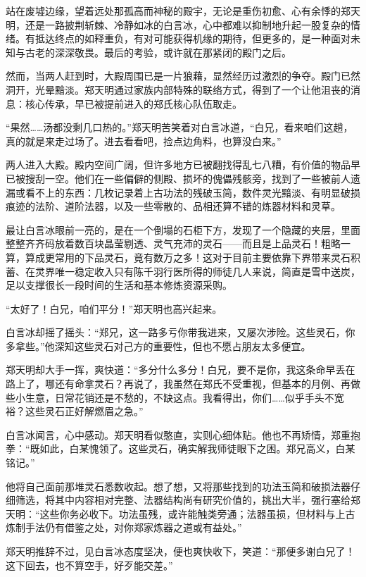 站在废墟边缘，望着远处那孤高而神秘的殿宇，无论是重伤初愈、心有余悸的郑天明，还是一路披荆斩棘、冷静如冰的白言冰，心中都难以抑制地升起一股复杂的情绪。有抵达终点的如释重负，有对可能获得机缘的期待，但更多的，是一种面对未知与古老的深深敬畏。最后的考验，或许就在那紧闭的殿门之后。

然而，当两人赶到时，大殿周围已是一片狼藉，显然经历过激烈的争夺。殿门已然洞开，光晕黯淡。郑天明通过家族内部特殊的联络方式，得到了一个让他沮丧的消息：核心传承，早已被提前进入的郑氏核心队伍取走。

“果然……汤都没剩几口热的。”郑天明苦笑着对白言冰道，“白兄，看来咱们这趟，真的就是来走过场了。进去看看吧，捡点边角料，也算没白来。”

两人进入大殿。殿内空间广阔，但许多地方已被翻找得乱七八糟，有价值的物品早已被搜刮一空。他们在一些偏僻的侧殿、损坏的傀儡残骸旁，找到了一些被前人遗漏或看不上的东西：几枚记录着上古功法的残破玉简，数件灵光黯淡、有明显破损痕迹的法阶、道阶法器，以及一些零散的、品相还算不错的炼器材料和灵草。

最让白言冰眼前一亮的，是在一个倒塌的石柜下方，发现了一个隐藏的夹层，里面整整齐齐码放着数百块晶莹剔透、灵气充沛的灵石——而且是上品灵石！粗略一算，算成更常用的下品灵石，竟有数万之多！这对于目前主要依靠下界带来灵石积蓄、在灵界唯一稳定收入只有陈千羽行医所得的师徒几人来说，简直是雪中送炭，足以支撑很长一段时间的生活和基本修炼资源采购。

“太好了！白兄，咱们平分！”郑天明也高兴起来。

白言冰却摇了摇头：“郑兄，这一路多亏你带我进来，又屡次涉险。这些灵石，你多拿些。”他深知这些灵石对己方的重要性，但也不愿占朋友太多便宜。

郑天明却大手一挥，爽快道：“多分什么多分！白兄，要不是你，我这条命早丢在路上了，哪还有命拿灵石？再说了，我虽然在郑氏不受重视，但基本的月例、再做些小生意，日常花销还是不愁的，不缺这点。我看得出，你们……似乎手头不宽裕？这些灵石正好解燃眉之急。”

白言冰闻言，心中感动。郑天明看似憨直，实则心细体贴。他也不再矫情，郑重抱拳：“既如此，白某愧领了。这些灵石，确实解我师徒眼下之困。郑兄高义，白某铭记。”

他将自己面前那堆灵石悉数收起。想了想，又将那些找到的功法玉简和破损法器仔细筛选，将其中内容相对完整、法器结构尚有研究价值的，挑出大半，强行塞给郑天明：“这些你务必收下。功法虽残，或许能触类旁通；法器虽损，但材料与上古炼制手法仍有借鉴之处，对你郑家炼器之道或有益处。”

郑天明推辞不过，见白言冰态度坚决，便也爽快收下，笑道：“那便多谢白兄了！这下回去，也不算空手，好歹能交差。”

